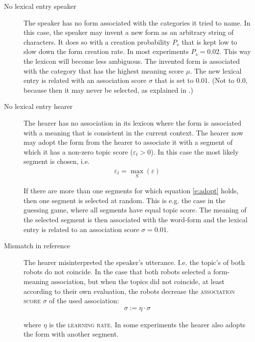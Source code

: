 \begin{description}
\item[No lexical entry speaker] The speaker has no form associated with the categories it tried to name. In this case, the speaker may invent a new form as an arbitrary string of characters. It does so with a creation probability $P_s$ that is kept low to slow down the form creation rate. In most experiments $P_s=0.02$. This way the lexicon will become less ambiguous. The invented form is associated with the category that has the highest meaning score $\mu$. The new lexical entry is related with an association score $\sigma$ that is set to 0.01. (Not to 0.0, because then it may never be selected, as explained in .)

\item[No lexical entry hearer] The hearer has no association in its lexicon where the form is associated with a meaning that is consistent in the current context. The hearer now may adopt the form from the hearer to associate it with a segment of which it has a non-zero topic score ($\varepsilon_t>0$). In this case the most likely segment is chosen, i.e. 
\begin{eqnarray}
\varepsilon_t = \max_S (\varepsilon)
\label{e:adopt}
\end{eqnarray}

\noindent If there are more than one segments for which equation \ref{e:adopt} holds, then one segment is selected at random. This is e.g. the case in the guessing game, where all segments have equal topic score. The meaning of the selected segment is then associated with the word-form and the lexical entry is related to an association score $\sigma=0.01$.

\item[Mismatch in reference] The hearer misinterpreted the speaker's utterance. I.e. the topic's of both robots do not coincide. In the case that both robots selected a form-meaning association, but when the topics did not coincide, at least according to their own evaluation, the robots decrease the \textsc{association score} $\sigma$ of the used association:
\begin{eqnarray}
\sigma := \eta \cdot \sigma
\label{e:cm:adapt1}
\end{eqnarray}


where $\eta$ is the {\scshape learning rate}. In some experiments the hearer also adopts the form with another segment.


\end{description}

